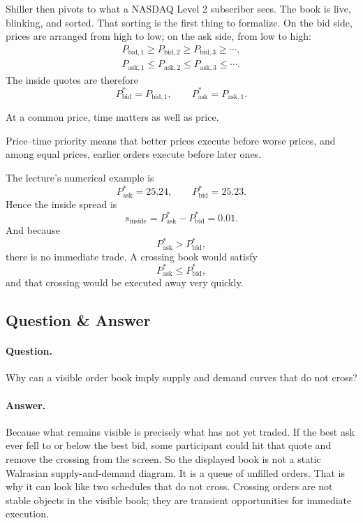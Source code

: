 Shiller then pivots to what a NASDAQ Level 2 subscriber sees. The book is live, blinking, and sorted. That sorting is the first thing to formalize. On the bid side, prices are arranged from high to low; on the ask side, from low to high:
\begin{align}
P_{\text{bid},1} \ge P_{\text{bid},2} \ge P_{\text{bid},3} \ge \cdots, \\
P_{\text{ask},1} \le P_{\text{ask},2} \le P_{\text{ask},3} \le \cdots.
\end{align}
The inside quotes are therefore
\begin{equation}
P_{\text{bid}}^{*}=P_{\text{bid},1},
\qquad
P_{\text{ask}}^{*}=P_{\text{ask},1}.
\end{equation}

At a common price, time matters as well as price.

\begin{remark}
Price--time priority means that better prices execute before worse prices, and among equal prices, earlier orders execute before later ones.
\end{remark}

The lecture's numerical example is
\begin{equation}
P_{\text{ask}}^{*}=25.24,
\qquad
P_{\text{bid}}^{*}=25.23.
\end{equation}
Hence the inside spread is
\begin{equation}
s_{\text{inside}}=P_{\text{ask}}^{*}-P_{\text{bid}}^{*}=0.01.
\end{equation}
And because
\begin{equation}
P_{\text{ask}}^{*} > P_{\text{bid}}^{*},
\end{equation}
there is no immediate trade. A crossing book would satisfy
\begin{equation}
P_{\text{ask}}^{*} \le P_{\text{bid}}^{*},
\end{equation}
and that crossing would be executed away very quickly.

\subsection{Question \& Answer}

\paragraph{Question.} Why can a visible order book imply supply and demand curves that do not cross?

\paragraph{Answer.} Because what remains visible is precisely what has not yet traded. If the best ask ever fell to or below the best bid, some participant could hit that quote and remove the crossing from the screen. So the displayed book is not a static Walrasian supply-and-demand diagram. It is a queue of unfilled orders. That is why it can look like two schedules that do not cross. Crossing orders are not stable objects in the visible book; they are transient opportunities for immediate execution.

